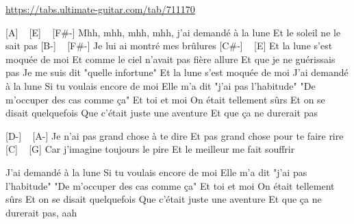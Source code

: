 
\url{https://tabs.ultimate-guitar.com/tab/711170}

\begin{guitar}

[A] ~ [E] ~ [F#-]
Mhh, mhh, mhh, mhh, j'ai demandé à la lune
Et le soleil ne le sait pas
[B-] ~ [F#-]
Je lui ai montré mes brûlures
[C#-] ~ [E]
Et la lune s'est moquée de moi
Et comme le ciel n'avait pas fière allure
Et que je ne guérissais pas
Je me suis dit "quelle infortune"
Et la lune s'est moquée de moi
J'ai demandé à la lune
Si tu voulais encore de moi
Elle m'a dit "j'ai pas l'habitude"
"De m'occuper des cas comme ça"
Et toi et moi
On était tellement sûrs
Et on se disait quelquefois
Que c'était juste une aventure
Et que ça ne durerait pas

[D-] ~ [A-]
Je n'ai pas grand chose à te dire
Et pas grand chose pour te faire rire
[C] ~ [G]
Car j'imagine toujours le pire
Et le meilleur me fait souffrir

J'ai demandé à la lune
Si tu voulais encore de moi
Elle m'a dit "j'ai pas l'habitude"
"De m'occuper des cas comme ça"
Et toi et moi
On était tellement sûrs
Et on se disait quelquefois
Que c'était juste une aventure
Et que ça ne durerait pas, aah

\end{guitar}